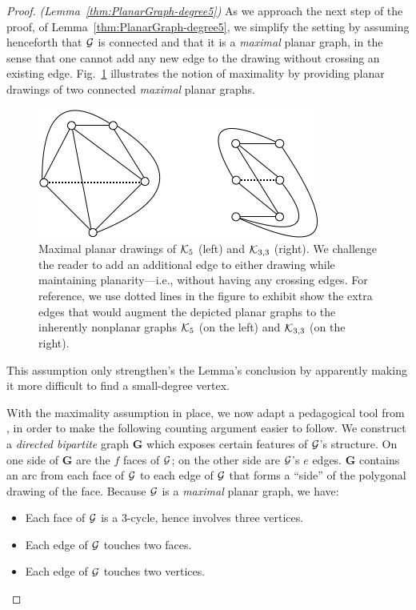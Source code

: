 \begin{proof} {\em (Lemma~\ref{thm:PlanarGraph-degree5})}
As we approach the next step of the proof, of Lemma~\ref{thm:PlanarGraph-degree5}, we 
simplify the setting by assuming henceforth that  $\mbox{$\cal G$}$ is connected and that it is a 
{\em maximal} planar graph, in the sense that one cannot add any new edge to the 
drawing without crossing an existing edge.  Fig.~\ref{fig:K5andK3by3} illustrates the notion 
of maximality by providing planar drawings of two connected {\em maximal} planar graphs.
\begin{figure}[hbt]
\begin{center}
       \includegraphics[scale=0.55]{FiguresGraph/K5andK3by3}
       \caption{Maximal planar drawings of $\mbox{$\cal K$}_5$ (left) and $\mbox{$\cal K$}_{3,3}$ (right).  We challenge the 
       reader to add an additional edge to either drawing while maintaining planarity---i.e., without
       having any crossing edges.  For reference, we use dotted lines in the figure to exhibit
       show the extra edges that would augment the depicted planar graphs to the
       inherently nonplanar graphs $\mbox{$\cal K$}_5$ (on the left) and $\mbox{$\cal K$}_{3,3}$ (on the right).}
  \label{fig:K5andK3by3}
\end{center}
\end{figure}
This assumption only strengthen's the Lemma's conclusion by apparently making it more 
difficult to find a small-degree vertex.


With the maximality assumption in place, we now adapt a pedagogical tool from
\cite{Berge73}, in order to make the following counting argument
easier to follow.  We construct a {\em directed bipartite} graph {\bf G} which exposes certain
features of $\mbox{$\cal G$}$'s structure.  On one side of {\bf G} are the $f$ faces of $\mbox{$\cal G$}$; on the other side
are $\mbox{$\cal G$}$'s $e$ edges.  {\bf G} contains an arc from each face of $\mbox{$\cal G$}$ to
each edge of $\mbox{$\cal G$}$ that forms a ``side'' of the polygonal drawing of the face.  Because $\mbox{$\cal G$}$ is
a {\em maximal} planar graph, we have:
\begin{itemize}
\item
Each face of $\mbox{$\cal G$}$ is a $3$-cycle, hence involves three vertices.
\item
Each edge of $\mbox{$\cal G$}$ touches two faces.
\item
Each edge of $\mbox{$\cal G$}$ touches two vertices.
\end{itemize}


\end{proof}
